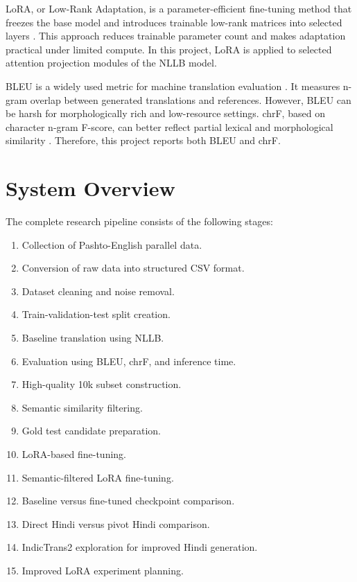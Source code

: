 \documentclass[conference]{IEEEtran}
\begin{document}
LoRA, or Low-Rank Adaptation, is a parameter-efficient fine-tuning method that freezes the base model and introduces trainable low-rank matrices into selected layers \cite{lora}. This approach reduces trainable parameter count and makes adaptation practical under limited compute. In this project, LoRA is applied to selected attention projection modules of the NLLB model.

BLEU is a widely used metric for machine translation evaluation \cite{bleu}. It measures n-gram overlap between generated translations and references. However, BLEU can be harsh for morphologically rich and low-resource settings. chrF, based on character n-gram F-score, can better reflect partial lexical and morphological similarity \cite{chrf}. Therefore, this project reports both BLEU and chrF.

\section{System Overview}

The complete research pipeline consists of the following stages:

\begin{enumerate}
    \item Collection of Pashto-English parallel data.
    \item Conversion of raw data into structured CSV format.
    \item Dataset cleaning and noise removal.
    \item Train-validation-test split creation.
    \item Baseline translation using NLLB.
    \item Evaluation using BLEU, chrF, and inference time.
    \item High-quality 10k subset construction.
    \item Semantic similarity filtering.
    \item Gold test candidate preparation.
    \item LoRA-based fine-tuning.
    \item Semantic-filtered LoRA fine-tuning.
    \item Baseline versus fine-tuned checkpoint comparison.
    \item Direct Hindi versus pivot Hindi comparison.
    \item IndicTrans2 exploration for improved Hindi generation.
    \item Improved LoRA experiment planning.
\end{enumerate}
\end{document}
